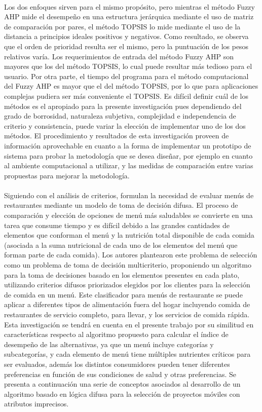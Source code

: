 \\
Los dos enfoques sirven para el mismo propósito, pero mientras el método Fuzzy AHP mide el desempeño en una estructura jerárquica mediante el uso de matriz de comparación por pares, el método TOPSIS lo mide mediante el uso de la distancia a principios ideales positivos y negativos. Como resultado, se observa que el orden de prioridad resulta ser el mismo, pero la puntuación de los pesos relativos varía. Los requerimientos de entrada del método Fuzzy AHP son mayores que los del método TOPSIS, lo cual puede resultar más tedioso para el usuario. Por otra parte, el tiempo del programa para el método computacional del Fuzzy AHP es mayor que el del método TOPSIS, por lo que para aplicaciones complejas pudiera ser más conveniente el TOPSIS. Es difícil definir cuál de los métodos es el apropiado para la presente investigación pues dependiendo del grado de borrosidad, naturaleza subjetiva, complejidad e independencia de criterio y consistencia, puede variar la elección de implementar uno de los dos métodos. El procedimiento y resultados de esta investigación proveen de información aprovechable en cuanto a la forma de implementar un prototipo de sistema para probar la metodología que se desea diseñar, por ejemplo en cuanto al ambiente computacional a utilizar, y las medidas de comparación entre varias propuestas para mejorar la metodología.\\
\\
Siguiendo con el análisis de criterios, \citet{tom2015fuzzy} formulan la necesidad de evaluar menús de restaurantes mediante un modelo de toma de decisión difusa. El proceso de comparación y elección de opciones de menú más saludables se convierte en una tarea que consume tiempo y es difícil debido a las grandes cantidades de elementos que conforman el menú y la nutrición total disponible de cada comida (asociada a la suma nutricional de cada uno de los elementos del menú que forman parte de cada comida). 
Los autores plantearon este problema de selección como un problema de toma de decisión multicriterio, proponiendo un algoritmo para la toma de decisiones basado en los elementos presentes en cada plato, utilizando  criterios difusos priorizados elegidos por los clientes para la selección de comida en un menú. Este clasificador para menús de restaurante se puede aplicar a diferentes tipos de alimentación fuera del hogar  incluyendo comida de restaurantes de servicio completo, para llevar, y los servicios de comida rápida.
Esta investigación se tendrá en cuenta en el presente trabajo por su similitud en características respecto al algoritmo propuesto para calcular el índice de desempeño de las alternativas, ya que un menú incluye categorías y subcategorías, y cada elemento de menú tiene múltiples nutrientes críticos para ser evaluados, además los distintos consumidores pueden tener diferentes preferencias en función de sus condiciones de salud y otras preferencias.
Se presenta a continuación una serie de conceptos asociados al desarrollo de un algoritmo basado en lógica difusa para la selección de proyectos móviles con atributos imprecisos.

